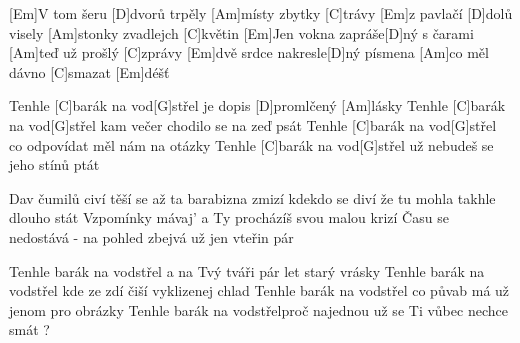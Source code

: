 
[Em]V tom šeru [D]dvorů trpěly [Am]místy zbytky [C]trávy
[Em]z pavlačí [D]dolů visely [Am]stonky zvadlejch [C]květin 
[Em]Jen vokna zapráše[D]ný s čarami [Am]teď už prošlý [C]zprávy
[Em]dvě srdce nakresle[D]ný písmena [Am]co měl dávno [C]smazat [Em]déšť

Tenhle [C]barák na vod[G]střel je dopis [D]promlčený [Am]lásky
Tenhle [C]barák na vod[G]střel kam večer chodilo se na zeď psát
Tenhle [C]barák na vod[G]střel co odpovídat měl nám na otázky
Tenhle [C]barák na vod[G]střel už nebudeš se jeho stínů ptát

Dav čumilů civí těší se až ta barabizna zmizí
kdekdo se diví že tu mohla takhle dlouho stát  
Vzpomínky mávaj'  a Ty procházíš svou malou krizí
Času se nedostává - na pohled zbejvá už jen vteřin pár 

Tenhle barák na vodstřel a na Tvý tváři pár let starý vrásky
Tenhle barák na vodstřel kde ze zdí čiší vyklizenej chlad
Tenhle barák na vodstřel co půvab má už jenom pro obrázky
Tenhle barák na vodstřelproč najednou už se Ti vůbec nechce smát ?

